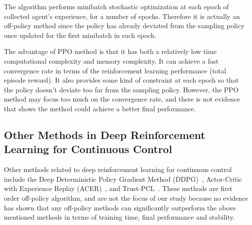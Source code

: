The algorithm performs minibatch stochastic optimization at each epoch of collected agent's experience, for a number of epochs. Therefore it is actually an off-policy method since the policy has already deviated from the sampling policy once updated for the first minibatch in each epoch.

The advantage of PPO method is that it has both a relatively low time computational complexity and memory complexity. It can achieve a fast convergence rate in terms of the reinforcement learning performance (total episode reward). It also provides some kind of constraint at each epoch so that the policy doesn't deviate too far from the sampling policy. However, the PPO method may focus too much on the convergence rate, and there is not evidence that shows the method could achieve a better final performance.
\subsection{Other Methods in Deep Reinforcement Learning for Continuous Control}
Other methods related to deep reinforcement learning for continuous control include the Deep Deterministic Policy Gradient Method (DDPG)~\cite{lillicrap2015continuous}, Actor-Critic with Experience Replay (ACER)~\cite{wang2016sample}, and Trust-PCL~\cite{nachum2017trust}. These methods are first order off-policy algorithm, and are not the focus of our study because no evidence has shown that any off-policy methods can significantly outperform the above mentioned methods in terms of training time, final performance and stability.

